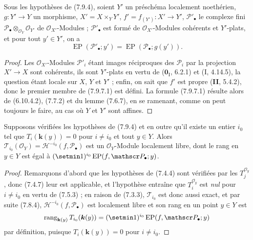 \begin{proposition}[7.9.7]
\label{III.7.9.7.fr}
Sous les hypothèses de \textup{(7.9.4)}, soient $Y'$ un préschéma localement noethérien,
$g:Y'\to Y$ un morphisme, $X'=X\times_Y Y'$, $f'=f_{(Y')}:X'\to Y'$,
$\mathscr P'_\bullet$ le complexe fini
$\mathscr P_\bullet\otimes_{\mathscr O_Y}\mathscr O_{Y'}$
de $\mathscr O_{X'}$-Modules ; $\mathscr P'_\bullet$ est formé de
$\mathscr O_{X'}$-Modules cohérents et $Y'$-plats, et pour tout $y'\in Y'$, on a
\[
  \operatorname{EP}(\mathscr P'_\bullet;y')
  =\operatorname{EP}(\mathscr P_\bullet;g(y')).
  \tag{7.9.7.1}\label{III.7.9.7.1.fr}
\]
\end{proposition}

\begin{proof}
Les $\mathscr O_{X'}$-Modules $\mathscr P'_i$ étant images réciproques des
$\mathscr P_i$ par la projection $X'\to X$ sont cohérents, ils sont $Y'$-plats en
vertu de ($\mathbf{0}_{\mathrm I}$, 6.2.1) et (I, 4.14.5), la question étant locale sur
$X$, $Y$ et $Y'$ ; enfin, on sait que $f'$ est propre (\textbf{II}, 5.4.2), donc le
premier membre de (7.9.7.1) est défini. La formule (7.9.7.1) résulte alors de
(6.10.4.2), (7.7.2) et du lemme (7.6.7), en se ramenant, comme on peut toujours
le faire, au cas où $Y$ et $Y'$ sont affines.
\end{proof}

\begin{proposition}[7.9.8]
\label{III.7.9.8.fr}
Supposons vérifiées les hypothèses de \textup{(7.9.4)} et en outre qu'il existe un entier
$i_0$ tel que $T_i(\boldsymbol{k}(y))=0$ pour $i\ne i_0$ et tout $y\in Y$.
Alors $\mathscr T_{i_0}(\mathscr O_Y)=\mathscr H^{-i_0}(f,\mathscr P_\bullet)$
est un $\mathscr O_Y$-Module localement libre, dont le rang en $y\in Y$ est égal
à $(\setmin 1)^{i_0}\operatorname{EP}(f,\mathscr P_\bullet;y)$.
\end{proposition}

\begin{proof}
Remarquons d'abord que les hypothèses de (7.4.4) sont vérifiées par les
$T_j^{\mathscr O_y}$, donc (7.4.7) leur est applicable, et l'hypothèse
entraîne que $T_i^{\mathscr O_y}$ est \emph{nul} pour $i\ne i_0$ en
vertu de (7.5.3) ; en raison de (7.3.3), $\mathscr T_{i_0}$ est donc aussi exact,
et par suite (7.8.4), $\mathscr H^{-i_0}(f,\mathscr P_\bullet)$ est localement
libre et son rang en un point $y\in Y$ est
\[
  \operatorname{rang}_{\mathbf{k}(y)}
  T_{i_0}(\boldsymbol{k}(y))
  =(\setmin 1)^{i_0}\operatorname{EP}(f,\mathscr P_\bullet;y)
\]
par définition, puisque $T_i(\boldsymbol{k}(y))=0$ pour $i\ne i_0$.
\end{proof}

